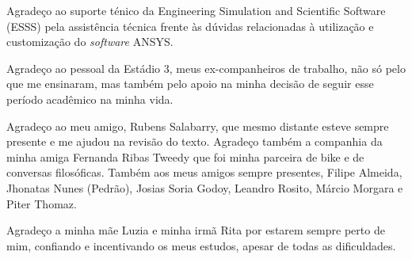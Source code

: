 Agradeço ao suporte ténico da Engineering Simulation and Scientific Software (ESSS) pela assistência técnica frente às dúvidas relacionadas à utilização e customização do \textit{software} ANSYS.

Agradeço ao pessoal da Estádio 3, meus ex-companheiros de trabalho, não só pelo que me ensinaram, mas também pelo apoio na minha decisão de seguir esse período acadêmico na minha vida.

Agradeço ao meu amigo, Rubens Salabarry, que mesmo distante esteve sempre presente e me ajudou na revisão do texto. Agradeço também a companhia da minha amiga Fernanda Ribas Tweedy que foi minha parceira de bike e de conversas filosóficas. Também aos meus amigos sempre presentes, Filipe Almeida, Jhonatas Nunes (Pedrão), Josias Soria Godoy, Leandro Rosito, Márcio Morgara e Piter Thomaz. 

Agradeço a minha mãe Luzia e minha irmã Rita por estarem sempre perto de mim, confiando e incentivando os meus estudos, apesar de todas as dificuldades.